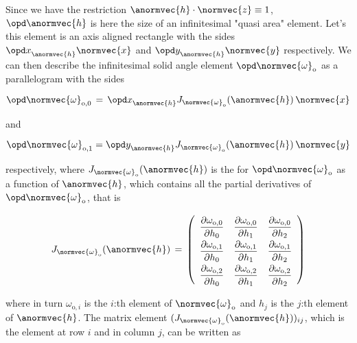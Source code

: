 Since we have the restriction $\anormvec{h}\cdot\normvec{z}\equiv 1$, $\opd\anormvec{h}$ is here the size of an infinitesimal "quasi area" element. Let's \assume this element is an axis aligned rectangle with the sides $\opd x_{\anormvec{h}}^{\,}\normvec{x}$ and $\opd y_{\anormvec{h}}^{\,}\normvec{y}$ respectively. We can then describe the infinitesimal solid angle element $\opd\normvec{\omega}_{\text{o}}$ as a parallelogram with the sides

\begin{equation} \label{eq:domega0}
\opd\normvec{\omega}_{\text{o},0} \,=\, \opd x_{\anormvec{h}}^{\,}J_{\normvec{\omega}_{\text{o}}}(\anormvec{h})^{\,}\normvec{x}
\end{equation}

and

\begin{equation} \label{eq:domega1}
\opd\normvec{\omega}_{\text{o},1} = \opd y_{\anormvec{h}}^{\,}J_{\normvec{\omega}_{\text{o}}}(\anormvec{h})^{\,}\normvec{y}
\end{equation}

respectively, where $J_{\normvec{\omega}_{\text{o}}}(\anormvec{h})$ is the  for $\opd\normvec{\omega}_{\text{o}}$ as a function of $\anormvec{h}$, which contains all the partial derivatives of $\opd\normvec{\omega}_{\text{o}}$, that is

\begin{equation} \label{eq:jacobian_matrix}
J_{\normvec{\omega}_{\text{o}}}(\anormvec{h}) \,=\, \renewcommand*{\arraystretch}{2} \left( \begin{array}{ccc}
\displaystyle \frac{\partial\omega_{\text{o},0}}{\partial h_0} &
\displaystyle \frac{\partial\omega_{\text{o},0}}{\partial h_1} &
\displaystyle \frac{\partial\omega_{\text{o},0}}{\partial h_2} \\
\displaystyle \frac{\partial\omega_{\text{o},1}}{\partial h_0} &
\displaystyle \frac{\partial\omega_{\text{o},1}}{\partial h_1} &
\displaystyle \frac{\partial\omega_{\text{o},1}}{\partial h_2} \\
\displaystyle \frac{\partial\omega_{\text{o},2}}{\partial h_0} &
\displaystyle \frac{\partial\omega_{\text{o},2}}{\partial h_1} &
\displaystyle \frac{\partial\omega_{\text{o},2}}{\partial h_2} 
\end{array} \right)
\end{equation}

where in turn $\omega_{\text{o},i}$ is the $i$:th element of $\normvec{\omega}_{\text{o}}$ and $h_{j}$ is the $j$:th element of $\anormvec{h}$. The matrix element $(J_{\normvec{\omega}_{\text{o}}}(\anormvec{h}))_{ij}$, which is the element at row $i$ and in column $j$, can be written as

